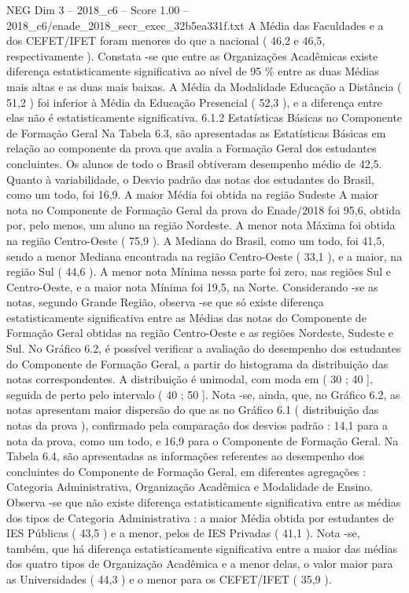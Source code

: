 \begin{textsample}{NEG Dim 3 – 2018\_c6 – Score 1.00 – 2018\_c6/enade\_2018\_secr\_exec\_32b5ea331f.txt}
A Média das Faculdades e a dos CEFET/IFET foram menores do que a nacional ( 46,2 e 46,5, respectivamente ).
Constata -se que entre as Organizações Acadêmicas existe diferença estatisticamente significativa ao nível de 95 \% entre as duas Médias mais altas e as duas mais baixas.
A Média da Modalidade Educação a Distância ( 51,2 ) foi inferior à Média da Educação Presencial ( 52,3 ), e a diferença entre elas não é estatisticamente significativa. 6.1.2 Estatísticas Básicas no Componente de Formação Geral Na Tabela 6.3, são apresentadas as Estatísticas Básicas em relação ao componente da prova que avalia a Formação Geral dos estudantes concluintes.
Os alunos de todo o Brasil obtiveram desempenho médio de 42,5.
Quanto à variabilidade, o Desvio padrão das notas dos estudantes do Brasil, como um todo, foi 16,9.
A maior Média foi obtida na região Sudeste A maior nota no Componente de Formação Geral da prova do Enade/2018 foi 95,6, obtida por, pelo menos, um aluno na região Nordeste.
A menor nota Máxima foi obtida na região Centro-Oeste ( 75,9 ).
A Mediana do Brasil, como um todo, foi 41,5, sendo a menor Mediana encontrada na região Centro-Oeste ( 33,1 ), e a maior, na região Sul ( 44,6 ).
A menor nota Mínima nessa parte foi zero, nas regiões Sul e Centro-Oeste, e a maior nota Mínima foi 19,5, na Norte.
Considerando -se as notas, segundo Grande Região, observa -se que só existe diferença estatisticamente significativa entre as Médias das notas do Componente de Formação Geral obtidas na região Centro-Oeste e as regiões Nordeste, Sudeste e Sul.
No Gráfico 6.2, é possível verificar a avaliação do desempenho dos estudantes do Componente de Formação Geral, a partir do histograma da distribuição das notas correspondentes.
A distribuição é unimodal, com moda em ( 30 ; 40 ], seguida de perto pelo intervalo ( 40 ; 50 ].
Nota -se, ainda, que, no Gráfico 6.2, as notas apresentam maior dispersão do que as no Gráfico 6.1 ( distribuição das notas da prova ), confirmado pela comparação dos desvios padrão : 14,1 para a nota da prova, como um todo, e 16,9 para o Componente de Formação Geral.
Na Tabela 6.4, são apresentadas as informações referentes ao desempenho dos concluintes do Componente de Formação Geral, em diferentes agregações : Categoria Administrativa, Organização Acadêmica e Modalidade de Ensino.
Observa -se que não existe diferença estatisticamente significativa entre as médias dos tipos de Categoria Administrativa : a maior Média obtida por estudantes de IES Públicas ( 43,5 ) e a menor, pelos de IES Privadas ( 41,1 ).
Nota -se, também, que há diferença estatisticamente significativa entre a maior das médias dos quatro tipos de Organização Acadêmica e a menor delas, o valor maior para as Universidades ( 44,3 ) e o menor para os CEFET/IFET ( 35,9 ).

\end{textsample}
